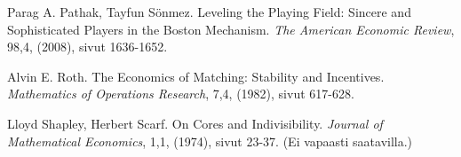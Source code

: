 \documentclass[twoside]{tktltiki}
\begin{document}
\begin{thebibliography}{XXX99}
  Parag A. Pathak, Tayfun Sönmez.
  Leveling the Playing Field: Sincere and Sophisticated Players in the
  Boston Mechanism.
  \emph{The American Economic Review}, 98,4, (2008), sivut 1636-1652.

  Alvin E. Roth.
  The Economics of Matching: Stability and Incentives.
  \emph{Mathematics of Operations Research}, 7,4, (1982), sivut 617-628.

  Lloyd Shapley, Herbert Scarf.
  On Cores and Indivisibility.
  \emph{Journal of Mathematical Economics}, 1,1, (1974), sivut 23-37.
  (Ei vapaasti saatavilla.)

\end{thebibliography}
\lastpage
\end{document}

